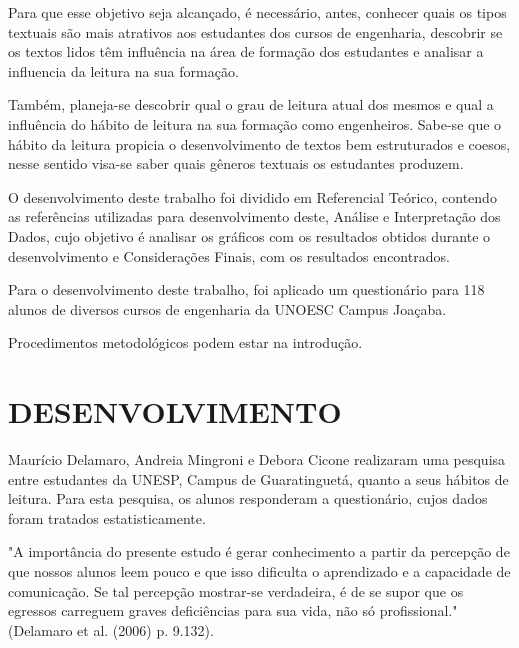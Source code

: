 \documentclass[
	article,			%
	11pt,				%
	oneside,			%
	a4paper,			%
	english,			%
	brazil,				%
	sumario=tradicional
	]{abntex2}
\begin{document}
Para que esse objetivo seja alcançado, é necessário, antes, conhecer quais os tipos textuais são mais atrativos aos estudantes dos cursos de engenharia, descobrir se os textos lidos têm influência na área de formação dos estudantes e analisar a influencia da leitura na sua formação.

Também, planeja-se descobrir qual o grau de leitura atual dos mesmos e qual a influência do hábito de leitura na sua formação como engenheiros. Sabe-se que o hábito da leitura propicia o desenvolvimento de textos bem estruturados e coesos, nesse sentido visa-se saber quais gêneros textuais os estudantes produzem.

O desenvolvimento deste trabalho foi dividido em Referencial Teórico, contendo as referências utilizadas para desenvolvimento deste, Análise e Interpretação dos Dados, cujo objetivo é analisar os gráficos com os resultados obtidos durante o desenvolvimento e Considerações Finais, com os resultados encontrados.

Para o desenvolvimento deste trabalho, foi aplicado um questionário para 118 alunos de diversos cursos de engenharia da UNOESC Campus Joaçaba. 

Procedimentos metodológicos podem estar na introdução.


\section{DESENVOLVIMENTO}


Maurício Delamaro, Andreia Mingroni e Debora Cicone realizaram uma pesquisa entre estudantes da UNESP, Campus de Guaratinguetá, quanto a seus hábitos de leitura. Para esta pesquisa, os alunos responderam a questionário, cujos dados foram tratados estatisticamente. 

"A importância do presente estudo é gerar conhecimento a partir da percepção de que nossos alunos leem pouco e que isso dificulta o aprendizado e a capacidade de comunicação. Se tal percepção mostrar-se verdadeira, é de se supor que os egressos carreguem graves deficiências para sua vida, não só profissional." (Delamaro et al. (2006) p. 9.132). 	
\end{document}
